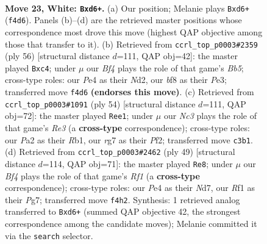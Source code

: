\documentclass[11pt]{article}
\begin{document}
\clearpage

\begin{figure}[p]\centering
\begin{subfigure}{0.46\textwidth}\centering
\resizebox{\linewidth}{!}{%
\newchessgame
\chessboard[
  setfen={r2qnb2/3nkpr1/2Qp2p1/2pP2N1/4PB2/1PN5/P2K4/5R1R w - - 9 23},
  showmover=false,
  pgfstyle=straightmove, color=movearrow, markmove={f4-d6}
]}
\caption{}
\end{subfigure}\hfill
\begin{subfigure}{0.46\textwidth}\centering
\resizebox{\linewidth}{!}{%
\newchessgame
\chessboard[
  setfen={2rr2k1/4qpbp/6p1/pB2n3/P1p2Q1P/4P3/2RN1PP1/5RK1 w - - 0 29},
  showmover=false,
  pgfstyle=straightmove, color=movearrow, markmove={b5-c4}
]}
\caption{}
\end{subfigure}
\\[4pt]
\begin{subfigure}{0.46\textwidth}\centering
\resizebox{\linewidth}{!}{%
\newchessgame
\chessboard[
  setfen={rr2q1k1/5pbp/3Qn1p1/3Np3/2b1P3/4RNP1/5PBP/1R4K1 w - - 2 28},
  showmover=false,
  pgfstyle=straightmove, color=movearrow, markmove={e3-e1}
]}
\caption{}
\end{subfigure}\hfill
\begin{subfigure}{0.46\textwidth}\centering
\resizebox{\linewidth}{!}{%
\newchessgame
\chessboard[
  setfen={5rk1/3n2pp/2p1pn2/2Pp4/1q1P4/1N4PB/2bNPP2/Q4RK1 b - - 2 25},
  showmover=false,
  pgfstyle=straightmove, color=movearrow, markmove={f8-e8}
]}
\caption{}
\end{subfigure}
\caption{\textbf{Move 23, White: \texttt{Bxd6+}.} (a) Our position; Melanie plays \texttt{Bxd6+} (\texttt{f4d6}). Panels (b)--(d) are the retrieved master positions whose correspondence most drove this move (highest QAP objective among those that transfer to it). (b) Retrieved from \texttt{ccrl\_top\_p0003\#2359} (ply 56) [structural distance $d$=111, QAP obj=42]: the master played \texttt{Bxc4}; under $\mu$ our \emph{Bf4} plays the role of that game's \emph{Bb5}; cross-type roles: our \emph{P}e4 as their \emph{N}d2, our \emph{b}f8 as their \emph{P}e3; transferred move \texttt{f4d6} \textbf{(endorses this move)}. (c) Retrieved from \texttt{ccrl\_top\_p0003\#1091} (ply 54) [structural distance $d$=111, QAP obj=72]: the master played \texttt{Ree1}; under $\mu$ our \emph{Nc3} plays the role of that game's \emph{Re3} (a \textbf{cross-type} correspondence); cross-type roles: our \emph{P}a2 as their \emph{R}b1, our \emph{r}g7 as their \emph{P}f2; transferred move \texttt{c3b1}. (d) Retrieved from \texttt{ccrl\_top\_p0003\#2462} (ply 49) [structural distance $d$=114, QAP obj=71]: the master played \texttt{Re8}; under $\mu$ our \emph{Bf4} plays the role of that game's \emph{Rf1} (a \textbf{cross-type} correspondence); cross-type roles: our \emph{P}e4 as their \emph{N}d7, our \emph{R}f1 as their \emph{P}g7; transferred move \texttt{f4h2}. Synthesis: 1 retrieved analog transferred to \texttt{Bxd6+} (summed QAP objective 42, the strongest correspondence among the candidate moves); Melanie committed it via the \texttt{search} selector.}
\label{fig:thought-m44}
\end{figure}
\end{document}

